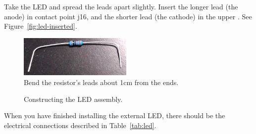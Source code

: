 Take the LED and spread the leads apart slightly.
Insert the longer lead (the anode) in contact point j16, and the shorter lead (the cathode) in the upper \ground.
See Figure~\ref{fig:led-inserted}.

\begin{figure}
    \centering
    \includegraphics[height=2cm]{direct/led/resistor-bent}
    \caption{Bend the resistor's leads about 1cm from the ends.\label{fig:resistor-bent}}
\end{figure}

\begin{figure}
    \centering
    \hfil
    \caption{Constructing the LED assembly.}
\end{figure}

When you have finished installing the external LED, there should be the electrical connections described in Table~\ref{tab:led}.

